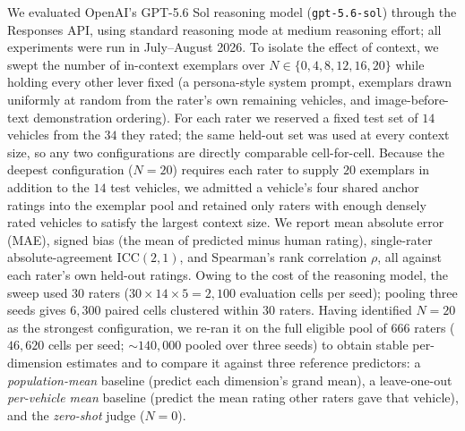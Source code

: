 
We evaluated OpenAI's GPT-5.6 Sol reasoning model (\texttt{gpt-5.6-sol}) through
the Responses API, using standard reasoning mode at medium reasoning effort; all
experiments were run in July--August 2026. To isolate the effect of context, we
swept the number of in-context exemplars over $N \in \{0, 4, 8, 12, 16, 20\}$
while holding every other lever fixed (a persona-style system prompt, exemplars
drawn uniformly at random from the rater's own remaining vehicles, and image-before-text
demonstration ordering). For each rater we reserved a fixed test set of $14$
vehicles from the $34$ they rated; the same held-out set was used at every context
size, so any two configurations are directly comparable cell-for-cell. Because the
deepest configuration ($N{=}20$) requires each rater to supply $20$ exemplars in
addition to the $14$ test vehicles, we admitted a vehicle's four shared anchor
ratings into the exemplar pool and retained only raters with enough densely rated
vehicles to satisfy the largest context size. We report mean absolute error (MAE),
signed bias (the mean of predicted minus human rating), single-rater absolute-agreement
ICC$(2,1)$, and Spearman's rank correlation $\rho$, all against each rater's own
held-out ratings. Owing to the cost of the reasoning model, the sweep used $30$
raters ($30 \times 14 \times 5 = 2{,}100$ evaluation cells per seed); pooling three
seeds gives $6{,}300$ paired cells clustered within $30$ raters. Having identified
$N{=}20$ as the strongest configuration, we re-ran it on the full eligible pool of
$666$ raters ($46{,}620$ cells per seed; ${\sim}140{,}000$ pooled over three seeds)
to obtain stable per-dimension estimates and to compare it against three
reference predictors: a \emph{population-mean} baseline (predict each dimension's
grand mean), a leave-one-out \emph{per-vehicle mean} baseline (predict the mean
rating other raters gave that vehicle), and the \emph{zero-shot} judge ($N{=}0$).

